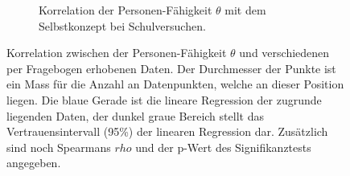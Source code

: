 \begin{figure}[htbp]
\begin{subfigure}{0.49\textwidth}
    \caption{Korrelation der Personen-Fähigkeit $\theta$ mit dem Selbstkonzept bei Schulversuchen.}
    \label{fig:corPersonenSelbskonzept}
  \end{subfigure}
 \caption{Korrelation zwischen der Personen-Fähigkeit $\theta$ und verschiedenen per Fragebogen erhobenen Daten. Der Durchmesser der Punkte ist ein Mass für die Anzahl an Datenpunkten, welche an dieser Position liegen. Die blaue Gerade ist die lineare Regression der zugrunde liegenden Daten, der dunkel graue Bereich stellt das Vertrauensintervall (95\%) der linearen Regression dar. Zusätzlich sind noch Spearmans $rho$ und der p-Wert des Signifikanztests angegeben.}
 \label{fig:corPersonen}
 \end{figure}
 